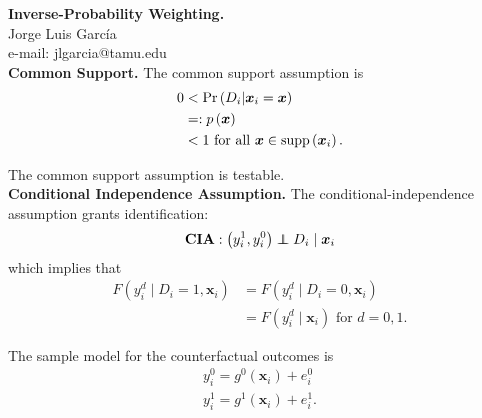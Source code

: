 
\let\counterwithout\relax
\let\counterwithin\relax
{}


\onehalfspacing

\noindent \textbf{Inverse-Probability Weighting.}\\
\noindent Jorge Luis García \\
\noindent e-mail: jlgarcia@tamu.edu\\

\noindent \textbf{Common Support.} The common support assumption is
\begin{align}
	0 & < \Pr \left( D_i | \bm{x}_i = \bm{x} \right) \nonumber \\
	  & =: p \left( \bm{x} \right) \nonumber \\
	  & < 1 \text{ for all } \bm{x} \in \operatorname{supp} \left( \bm{x}_i \right). 
\end{align}

\noindent The common support assumption is testable.\\

\noindent \textbf{Conditional Independence Assumption.} The conditional-independence assumption grants identification: 
\begin{align}
	\textbf{CIA}: \left( y_i^1, y_i^0 \right) \independent D_i \mid \bm{x}_i \nonumber 
\end{align}
\noindent which implies that
\begin{align}
	F \left( y_i^d \mid D_i = 1, \bm{x}_i \right) & = F \left( y_i^d \mid D_i =0, \bm{x}_i \right) \nonumber \\
	& = F \left( y_i^d \mid \bm{x}_i \right) \text{ for } d = 0,1. 
\end{align}

\noindent The sample model for the counterfactual outcomes is
\begin{align}
	y_i^0 = g^0 \left( \bm{x}_i \right) + e_i^0 \nonumber \\
	y_i^1 = g^1 \left( \bm{x}_i \right) + e_i^1.
\end{align}

